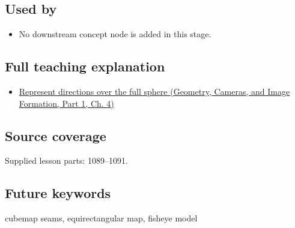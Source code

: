 \subsection{Used by}\label{appendix-fc99ad39f351-used-by}

\hypertarget{appendix-fc99ad39f351-used-by}{}

\begin{itemize}
\tightlist
\item
  No downstream concept node is added in this stage.
\end{itemize}

\subsection{Full teaching explanation}\label{appendix-fc99ad39f351-full-teaching-explanation}

\hypertarget{appendix-fc99ad39f351-full-teaching-explanation}{}

\begin{itemize}
\tightlist
\item
  \href{../03-Geometry-Cameras-and-Image-Formation-P01/main.pdf\#nameddest=02-foundations-ii-ch035-represent-directions-over-the-full-sphere}{Represent directions over the full sphere (Geometry, Cameras, and Image Formation, Part 1, Ch. 4)}
\end{itemize}

\subsection{Source coverage}\label{appendix-fc99ad39f351-source-coverage}

\hypertarget{appendix-fc99ad39f351-source-coverage}{}

Supplied lesson parts: 1089--1091.

\subsection{Future keywords}\label{appendix-fc99ad39f351-future-keywords}

\hypertarget{appendix-fc99ad39f351-future-keywords}{}

cubemap seams, equirectangular map, fisheye model
